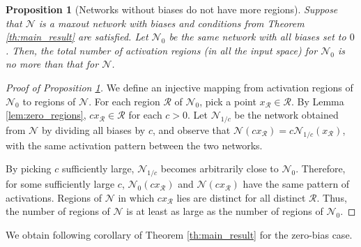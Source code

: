 \documentclass{article}
\newtheorem{proposition}[theorem]{Proposition}
\theoremstyle{definition}
\newcommand{\net}{\mathcal{N}}
\begin{document}
\begin{proposition}[Networks without biases do not have more regions]
    \label{prop:zero_bias}
    Suppose that $\net$ is a maxout network with biases and conditions from Theorem \ref{th:main_result} are satisfied. Let $\net_{0}$ be the same network with all biases set to $0$. Then, the total number of activation regions (in all the input space) for $\net_{0}$ is no more than that for $\net$.
\end{proposition}
\begin{proof}[Proof of Proposition \ref{prop:zero_bias}]
    We define an injective mapping from activation regions of $\net_0$ to regions of $\net$. For each region $\mathcal{R}$ of $\net_0$, pick a point $x_{\mathcal{R}} \in \mathcal{R}$. By Lemma \ref{lem:zero_regions}, $c x_{\mathcal{R}} \in \mathcal{R}$ for each $c > 0$. Let $\net_{1 / c}$ be the network obtained from $\net$ by dividing all biases by $c$, and observe that $\net(c x_{\mathcal{R}}) = c \net_{1/c} ( x_{\mathcal{R}})$, with the same activation pattern between the two networks.
    
    By picking $c$ sufficiently large, $\net_{1/c}$ becomes arbitrarily close to $\net_0$. Therefore, for some sufficiently large $c$, $\net_0(c x_{\mathcal{R}})$ and $\net(c  x_{\mathcal{R}})$ have the same pattern of activations. Regions of $\net$ in which $c x_{\mathcal{R}}$ lies are distinct for all distinct $\mathcal{R}$. Thus, the number of regions of $\net$ is at least as large as the number of regions of $\net_0$.
\end{proof}

We obtain following corollary of Theorem \ref{th:main_result} for the zero-bias case.
\end{document}
